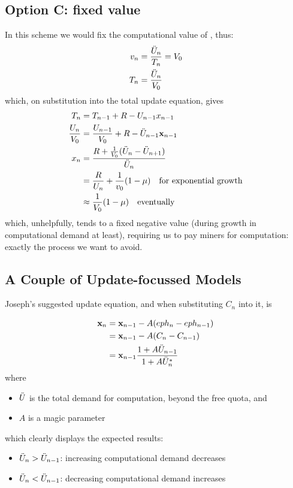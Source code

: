 \documentclass[11pt,a4paper]{article}
\begin{document}
\subsection*{Option C: fixed value}

In this scheme we would fix the computational value of \ether, thus:
\begin{align}
v_n &= \frac{\ddot{U}_n}{T_n} = V_0\\
T_n &= \frac{\ddot{U}_n}{V_0}
\end{align}
which, on substitution into the \ether total update equation, gives
\begin{align}
T_n &= T_{n-1} + R - U_{n-1} x_{n-1}\\
\frac{U_n}{V_0} &= \frac{U_{n-1}}{V_0} + R - \U_{n-1}\x_{n-1}\\
x_n &= \frac{ R + \frac{1}{V_0}(\U_n - \U_{n+1}) }{\U_n}\\
&= \frac{R}{U_n} + \frac{1}{v_0}(1 - \mu) \quad\mathrm{for\ exponential\ growth}\\
&\approx \frac{1}{V_0} (1 - \mu) \quad\mathrm{eventually}
\end{align}
which, unhelpfully, tends to a fixed negative value (during growth in computational demand at least), requiring us to pay miners for computation: exactly the process we want to avoid.

\subsection*{A Couple of Update-focussed Models}

Joseph's suggested update equation, and when substituting $C_n$ into it, is

\begin{align}
\mathbf x_n &= \mathbf x_{n-1} - A (eph_n - eph_{n-1})\\
     &= \mathbf x_{n-1} - A (C_n - C_{n-1})\\
     &= \mathbf x_{n-1} \frac{1 + A \ddot{U}_{n-1}}{1 + A \ddot{U}^{*}_{n}} 
\end{align}
where 
\begin{itemize}
\item $\ddot{U}$ is the total demand for computation, beyond the free quota, and
\item $A$ is a magic parameter
\end{itemize}
which clearly displays the expected results:
\begin{itemize}
\item[] $\ddot{U}_n > \ddot{U}_{n-1}$: increasing computational demand decreases \x
\item[] $\ddot{U}_n < \ddot{U}_{n-1}$: decreasing computational demand increases \x
\end{itemize}
\end{document}
